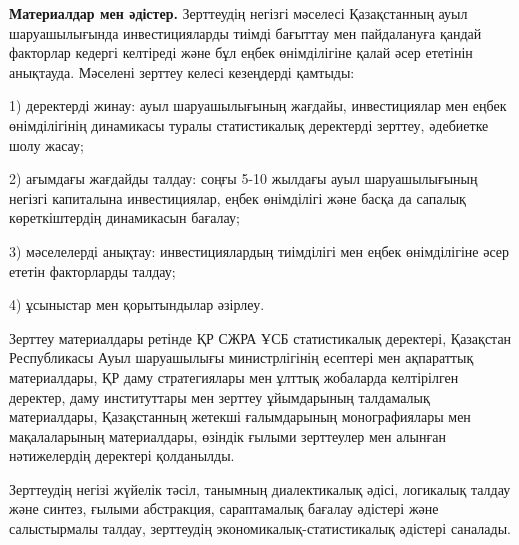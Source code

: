 \begin{multicols}{2}
{\bfseries Материалдар мен әдістер.} Зерттеудің негізгі мәселесі
Қазақстанның ауыл шаруашылығында инвестицияларды тиімді бағыттау мен
пайдалануға қандай факторлар кедергі келтіреді және бұл еңбек
өнімділігіне қалай әсер ететінін анықтауда. Мәселені зерттеу келесі
кезеңдерді қамтыды:

1) деректерді жинау: ауыл шаруашылығының жағдайы, инвестициялар мен
еңбек өнімділігінің динамикасы туралы статистикалық деректерді зерттеу,
әдебиетке шолу жасау;

2) ағымдағы жағдайды талдау: соңғы 5-10 жылдағы ауыл шаруашылығының
негізгі капиталына инвестициялар, еңбек өнімділігі және басқа да сапалық
көреткіштердің динамикасын бағалау;

3) мәселелерді анықтау: инвестициялардың тиімділігі мен еңбек
өнімділігіне әсер ететін факторларды талдау;

4) ұсыныстар мен қорытындылар әзірлеу.

Зерттеу материалдары ретінде ҚР СЖРА ҰСБ статистикалық деректері,
Қазақстан Республикасы Ауыл шаруашылығы министрлігінің есептері мен
ақпараттық материалдары, ҚР даму стратегиялары мен ұлттық жобаларда
келтірілген деректер, даму институттары мен зерттеу ұйымдарының
талдамалық материалдары, Қазақстанның жетекші ғалымдарының
монографиялары мен мақалаларының материалдары, өзіндік ғылыми зерттеулер
мен алынған нәтижелердің деректері қолданылды.

Зерттеудің негізі жүйелік тәсіл, танымның диалектикалық әдісі, логикалық
талдау және синтез, ғылыми абстракция, сараптамалық бағалау әдістері
және салыстырмалы талдау, зерттеудің экономикалық-статистикалық әдістері
саналады.


\end{multicols}
